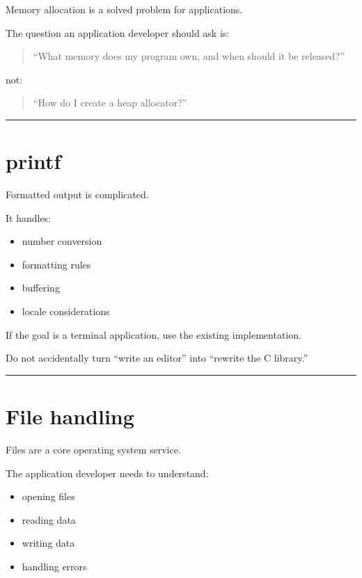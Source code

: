 \documentclass[
  oneside,
  openany]{book}
\providecommand{\tightlist}{%
  \setlength{\itemsep}{0pt}\setlength{\parskip}{0pt}}
\begin{document}
Memory allocation is a solved problem for applications.

The question an application developer should ask is:

\begin{quote}
``What memory does my program own, and when should it be released?''
\end{quote}

not:

\begin{quote}
``How do I create a heap allocator?''
\end{quote}

\begin{center}\rule{0.5\linewidth}{0.5pt}\end{center}

\hypertarget{printf}{%
\section{printf}\label{printf}}

Formatted output is complicated.

It handles:

\begin{itemize}
\tightlist
\item
  number conversion
\item
  formatting rules
\item
  buffering
\item
  locale considerations
\end{itemize}

If the goal is a terminal application, use the existing implementation.

Do not accidentally turn ``write an editor'' into ``rewrite the C
library.''

\begin{center}\rule{0.5\linewidth}{0.5pt}\end{center}

\hypertarget{file-handling}{%
\section{File handling}\label{file-handling}}

Files are a core operating system service.

The application developer needs to understand:

\begin{itemize}
\tightlist
\item
  opening files
\item
  reading data
\item
  writing data
\item
  handling errors
\end{itemize}
\end{document}
